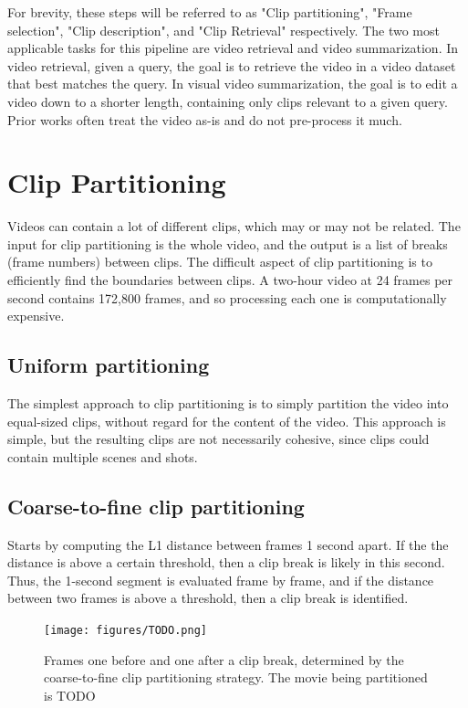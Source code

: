 \documentclass{article}
\begin{document}
For brevity, these steps will be referred to as "Clip partitioning", "Frame selection", "Clip description", and "Clip Retrieval" respectively.
The two most applicable tasks for this pipeline are video retrieval and video summarization.
In video retrieval, given a query, the goal is to retrieve the video in a video dataset that best matches the query.
In visual video summarization, the goal is to edit a video down to a shorter length, containing only clips relevant to a given query.
Prior works often treat the video as-is and do not pre-process it much.



\section{Clip Partitioning}

Videos can contain a lot of different clips, which may or may not be related.
The input for clip partitioning is the whole video, and the output is a list of breaks (frame numbers) between clips.
The difficult aspect of clip partitioning is to efficiently find the boundaries between clips.
A two-hour video at 24 frames per second contains 172,800 frames, and so processing each one is computationally expensive.
\subsection{Uniform partitioning}
The simplest approach to clip partitioning is to simply partition the video into equal-sized clips, without regard for the content of the video.
This approach is simple, but the resulting clips are not necessarily cohesive, since clips could contain multiple scenes and shots.
\subsection{Coarse-to-fine clip partitioning}
Starts by computing the L1 distance between frames 1 second apart.
If the the distance is above a certain threshold, then a clip break is likely in this second.
Thus, the 1-second segment is evaluated frame by frame, and if the distance between two frames is above a threshold, then a clip break is identified.

\begin{figure}
      \centering
      \texttt{[image: figures/TODO.png]}
      \caption{Frames one before and one after a clip break, determined by the coarse-to-fine clip partitioning strategy. The movie being partitioned is TODO}
      \label{fig:optical_flow}
\end{figure}
\end{document}

